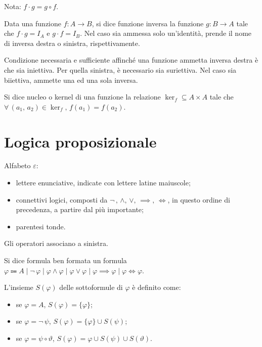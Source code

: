 \documentclass[10pt]{article}
\begin{document}
                Nota: \(f \cdot g = g \circ f\).

                Data una funzione \(f : A \to B\), si dice funzione inversa la funzione \(g : B \to A\) tale che
                \(f \cdot g = I_A\) e \(g \cdot f = I_B\). Nel caso sia ammessa solo un'identità, prende il nome di inversa destra
                o sinistra, rispettivamente.

                Condizione necessaria e sufficiente affinché una funzione ammetta inversa destra è che sia iniettiva. Per quella
                sinistra, è necessario sia suriettiva. Nel caso sia biiettiva, ammette una ed una sola inversa.

                Si dice nucleo o kernel di una funzione la relazione \(\ker_f \subseteq A \times A\) tale che
                \(\forall \, (a_1, \, a_2) \in \ker_f, \, f(a_1) = f(a_2)\).

    \section*{Logica proposizionale}

        Alfabeto \(\varepsilon\):
        \begin{itemize}
            \item lettere enunciative, indicate con lettere latine maiuscole;
            \item connettivi logici, composti da \(\neg \,, \, \land, \, \lor, \, \implies, \, \iff\), in questo ordine di precedenza,
                a partire dal più importante;
            \item parentesi tonde.
        \end{itemize}
        Gli operatori associano a sinistra.

        Si dice formula ben formata un formula \(\varphi \Coloneqq A \; | \; \neg \, \varphi \; | \; \varphi \land \varphi \; | \; \varphi \lor \varphi \; | \; \varphi \implies \varphi \; | \; \varphi \iff \varphi\).

        L'insieme \(S(\varphi)\) delle sottoformule di \(\varphi\) è definito come:
        \begin{itemize}
            \item se \(\varphi = A\), \(S(\varphi) = \{\varphi\}\);
            \item se \(\varphi = \neg \, \psi\), \(S(\varphi) = \{\varphi\} \cup S(\psi)\);
            \item se \(\varphi = \psi \circ \vartheta\), \(S(\varphi) = {\varphi} \cup S(\psi) \cup S(\vartheta)\).
        \end{itemize}
\end{document}
